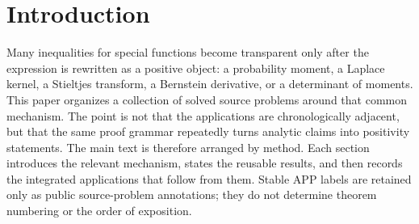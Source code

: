 \section{Introduction}
Many inequalities for special functions become transparent only after the expression is rewritten as a positive object: a probability moment, a Laplace kernel, a Stieltjes transform, a Bernstein derivative, or a determinant of moments.  This paper organizes a collection of solved source problems around that common mechanism.  The point is not that the applications are chronologically adjacent, but that the same proof grammar repeatedly turns analytic claims into positivity statements.
The main text is therefore arranged by method.  Each section introduces the relevant mechanism, states the reusable results, and then records the integrated applications that follow from them.  Stable APP labels are retained only as public source-problem annotations; they do not determine theorem numbering or the order of exposition.
